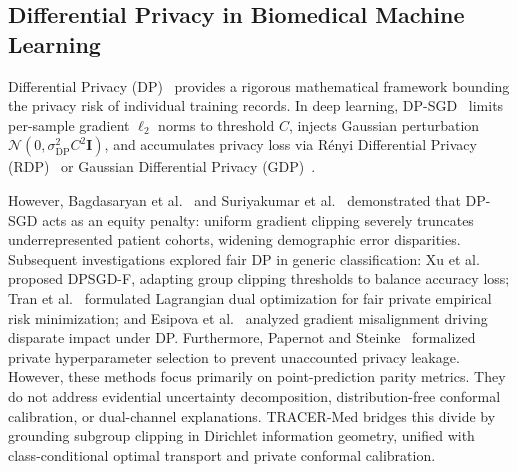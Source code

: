 \documentclass[3p,12pt]{elsarticle}
\theoremstyle{plain}
\theoremstyle{definition}
\begin{document}
\subsection{Differential Privacy in Biomedical Machine Learning}
Differential Privacy (DP)~\cite{dwork2014algorithmic} provides a rigorous mathematical framework bounding the privacy risk of individual training records. In deep learning, DP-SGD~\cite{abadi2016deep} limits per-sample gradient $\ell_2$ norms to threshold $C$, injects Gaussian perturbation $\mathcal{N}(0, \sigma_{\text{DP}}^2 C^2 \mathbf{I})$, and accumulates privacy loss via Rényi Differential Privacy (RDP)~\cite{mironov2017renyi,mironov2019renyi} or Gaussian Differential Privacy (GDP)~\cite{dong2022gaussian}.

However, Bagdasaryan et al.~\cite{bagdasaryan2019differential} and Suriyakumar et al.~\cite{suriyakumar2021chasing} demonstrated that DP-SGD acts as an equity penalty: uniform gradient clipping severely truncates underrepresented patient cohorts, widening demographic error disparities. Subsequent investigations explored fair DP in generic classification: Xu et al.~\cite{xu2021removing} proposed DPSGD-F, adapting group clipping thresholds to balance accuracy loss; Tran et al.~\cite{tran2021differentially} formulated Lagrangian dual optimization for fair private empirical risk minimization; and Esipova et al.~\cite{esipova2022gradient} analyzed gradient misalignment driving disparate impact under DP. Furthermore, Papernot and Steinke~\cite{papernot2022hyperparameter} formalized private hyperparameter selection to prevent unaccounted privacy leakage. However, these methods focus primarily on point-prediction parity metrics. They do not address evidential uncertainty decomposition, distribution-free conformal calibration, or dual-channel explanations. TRACER-Med bridges this divide by grounding subgroup clipping in Dirichlet information geometry, unified with class-conditional optimal transport and private conformal calibration.
\end{document}
